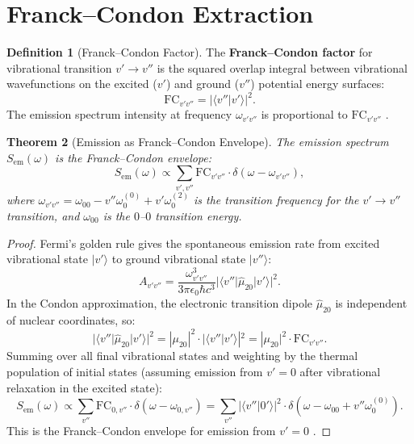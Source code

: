 \documentclass[11pt,a4paper]{article}
\newtheorem{theorem}{Theorem}[section]
\theoremstyle{definition}
\newtheorem{definition}[theorem]{Definition}
\theoremstyle{remark}
\begin{document}
\section{Franck--Condon Extraction}
\label{sec:fc}

\begin{definition}[Franck--Condon Factor]
\label{def:fc}
The \textbf{Franck--Condon factor} for vibrational transition $v' \to v''$ is the squared overlap integral between vibrational wavefunctions on the excited ($v'$) and ground ($v''$) potential energy surfaces:
\begin{equation}
\mathrm{FC}_{v'v''} = |\langle v'' | v' \rangle|^2.
\end{equation}
The emission spectrum intensity at frequency $\omega_{v'v''}$ is proportional to $\mathrm{FC}_{v'v''}$ \citep{franck1926, condon1928}.
\end{definition}

\begin{theorem}[Emission as Franck--Condon Envelope]
\label{thm:fc_envelope}
The emission spectrum $S_{\mathrm{em}}(\omega)$ is the Franck--Condon envelope:
\begin{equation}
\label{eq:fc_envelope}
S_{\mathrm{em}}(\omega) \propto \sum_{v', v''} \mathrm{FC}_{v'v''} \cdot \delta(\omega - \omega_{v'v''}),
\end{equation}
where $\omega_{v'v''} = \omega_{00} - v'' \omega_0^{(0)} + v' \omega_0^{(2)}$ is the transition frequency for the $v' \to v''$ transition, and $\omega_{00}$ is the $0$--$0$ transition energy.
\end{theorem}

\begin{proof}
Fermi's golden rule gives the spontaneous emission rate from excited vibrational state $|v'\rangle$ to ground vibrational state $|v''\rangle$:
\begin{equation}
A_{v'v''} = \frac{\omega_{v'v''}^3}{3\pi\epsilon_0\hbar c^3} |\langle v'' | \hat{\mu}_{20} | v' \rangle|^2.
\end{equation}
In the Condon approximation, the electronic transition dipole $\hat{\mu}_{20}$ is independent of nuclear coordinates, so:
\begin{equation}
|\langle v'' | \hat{\mu}_{20} | v' \rangle|^2 = |\mu_{20}|^2 \cdot |\langle v'' | v' \rangle|^2 = |\mu_{20}|^2 \cdot \mathrm{FC}_{v'v''}.
\end{equation}
Summing over all final vibrational states and weighting by the thermal population of initial states (assuming emission from $v' = 0$ after vibrational relaxation in the excited state):
\begin{equation}
S_{\mathrm{em}}(\omega) \propto \sum_{v''} \mathrm{FC}_{0,v''} \cdot \delta(\omega - \omega_{0,v''}) = \sum_{v''} |\langle v'' | 0' \rangle|^2 \cdot \delta(\omega - \omega_{00} + v'' \omega_0^{(0)}).
\end{equation}
This is the Franck--Condon envelope for emission from $v' = 0$ \citep{condon1928}.
\end{proof}
\end{document}
